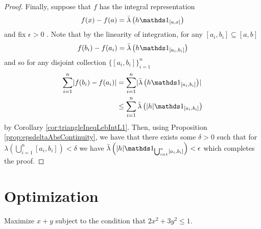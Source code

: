 \begin{proof}
Finally, suppose that $f$ has the integral representation
\[
f(x) - f(a) = \lebInt{\lambda}{h\indicate_{[a,x]}}
\] 
and fix $\epsilon > 0$ . Note that by the linearity of integration, for any $\left[a_i, b_i\right] \subseteq \left[a,b\right]$ 
\[
f(b_i) - f(a_i) = \lebInt{\lambda}{h\indicate_{[a_i,b_i]}}
\]
and so for any disjoint collection $\{[a_i,b_i]\}_{i=1}^n$
\begin{align*}
	\sum_{i=1}^{n} \lvert f(b_i)-f(a_i) \rvert &= \sum_{i=1}^n\lvert \lebInt{\lambda}{h\indicate_{[a_i,b_i]}}\rvert \\
	&\leq \sum_{i=1}^n\lebInt{\lambda}{\lvert h\rvert \indicate_{[a_i,b_i]}} 
\end{align*}
 by Corollary \ref{cor:triangleIneqLebIntL1}. Then, using Proposition \ref{prop:epsdeltaAbsContinuity}, we have that there exists some $\delta > 0$ such that for $\lambda\left(\bigcup_{i=1}^n[a_i,b_i]\right) < \delta $ we have $ \lebInt{\lambda}{\lvert h \rvert \indicate_{\bigcup_{i=1}^n[a_i,b_i]}} < \epsilon $ which completes the proof.
\end{proof}
%

\section{Optimization\label{sec:optimization}}
\begin{example}
\label{exa:isi2006samplepsb2}Maximize $x+y$ subject to the condition
that $2x^{2}+3y^{2}\leq1$.
\end{example}


